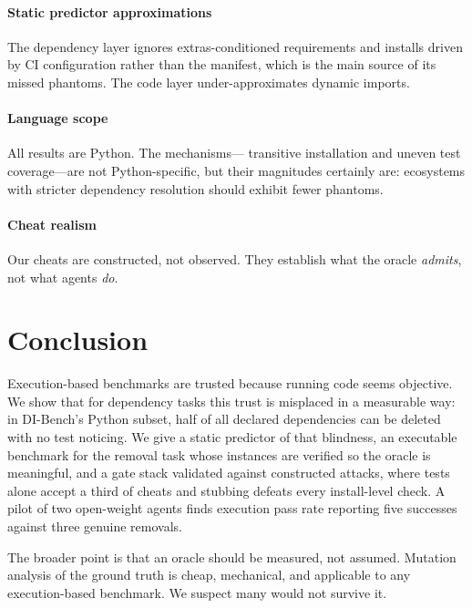 \documentclass[10pt,conference]{IEEEtran}
\newcommand{\dibench}{DI-Bench}
\begin{document}
\paragraph*{Static predictor approximations} The dependency layer ignores
extras-conditioned requirements and installs driven by CI configuration
rather than the manifest, which is the main source of its missed
phantoms. The code layer under-approximates dynamic imports.

\paragraph*{Language scope} All results are Python. The mechanisms---
transitive installation and uneven test coverage---are not
Python-specific, but their magnitudes certainly are: ecosystems with
stricter dependency resolution should exhibit fewer phantoms.

\paragraph*{Cheat realism} Our cheats are constructed, not observed. They
establish what the oracle \emph{admits}, not what agents \emph{do}.

\section{Conclusion}

Execution-based benchmarks are trusted because running code seems
objective. We show that for dependency tasks this trust is misplaced in a
measurable way: in \dibench's Python subset, half of all declared
dependencies can be deleted with no test noticing. We give a static
predictor of that blindness, an executable benchmark for the removal
task whose instances are verified so the oracle is meaningful, and a gate
stack validated against constructed attacks, where tests alone accept a
third of cheats and stubbing defeats every install-level check. A pilot
of two open-weight agents finds execution pass rate reporting five
successes against three genuine removals.

The broader point is that an oracle should be measured, not assumed.
Mutation analysis of the ground truth is cheap, mechanical, and applicable
to any execution-based benchmark. We suspect many would not survive it.

\end{document}
